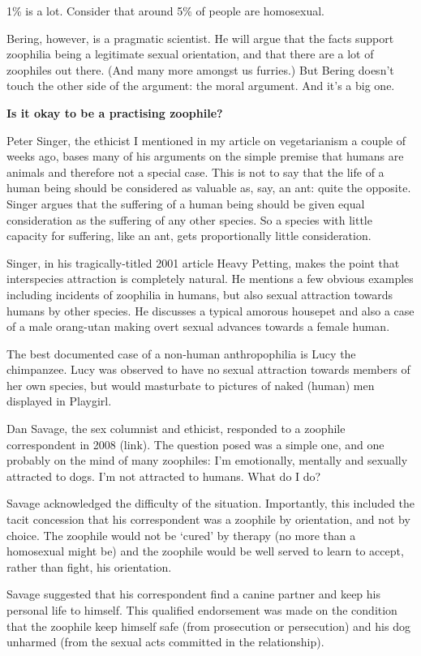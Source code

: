 1\% is a lot. Consider that around 5\% of people are homosexual.

Bering, however, is a pragmatic scientist. He will argue that the facts support zoophilia being a legitimate sexual orientation, and that there are a lot of zoophiles out there. (And many more amongst us furries.) But Bering doesn't touch the other side of the argument: the moral argument. And it's a big one.

\textbf{Is it okay to be a practising zoophile?}

Peter Singer, the ethicist I mentioned in my article on vegetarianism a couple of weeks ago, bases many of his arguments on the simple premise that humans are animals and therefore not a special case. This is not to say that the life of a human being should be considered as valuable as, say, an ant: quite the opposite. Singer argues that the suffering of a human being should be given equal consideration as the suffering of any other species. So a species with little capacity for suffering, like an ant, gets proportionally little consideration.

Singer, in his tragically-titled 2001 article Heavy Petting, makes the point that interspecies attraction is completely natural. He mentions a few obvious examples including incidents of zoophilia in humans, but also sexual attraction towards humans by other species. He discusses a typical amorous housepet and also a case of a male orang-utan making overt sexual advances towards a female human.

The best documented case of a non-human anthropophilia is Lucy the chimpanzee. Lucy was observed to have no sexual attraction towards members of her own species, but would masturbate to pictures of naked (human) men displayed in Playgirl.

Dan Savage, the sex columnist and ethicist, responded to a zoophile correspondent in 2008 (link). The question posed was a simple one, and one probably on the mind of many zoophiles: I'm emotionally, mentally and sexually attracted to dogs. I'm not attracted to humans. What do I do?

Savage acknowledged the difficulty of the situation. Importantly, this included the tacit concession that his correspondent was a zoophile by orientation, and not by choice. The zoophile would not be ‘cured' by therapy (no more than a homosexual might be) and the zoophile would be well served to learn to accept, rather than fight, his orientation.

Savage suggested that his correspondent find a canine partner and keep his personal life to himself. This qualified endorsement was made on the condition that the zoophile keep himself safe (from prosecution or persecution) and his dog unharmed (from the sexual acts committed in the relationship).

